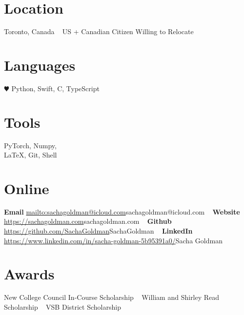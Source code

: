 \documentclass[]{style}
\begin{document}


\begin{aside} %
\section{Location}
Toronto, Canada
~ \vspace{-2mm}
US + Canadian Citizen 
Willing to Relocate
\section{Languages}
{\color{red} $\varheartsuit$} Python, Swift, 
C, TypeScript
\section{Tools}
PyTorch, Numpy, \\ \LaTeX, Git, Shell
\section{Online}
\textbf{Email}
\url{mailto:sachagoldman@icloud.com}{sachagoldman@icloud.com} 
~ \vspace{-2mm}
\textbf{Website} 
\url{https://sachagoldman.com}{sachagoldman.com} 
~ \vspace{-2mm}
\textbf{Github}
\url{https://github.com/SachaGoldman}{SachaGoldman}
~ \vspace{-2mm}
\textbf{LinkedIn}
\url{https://www.linkedin.com/in/sacha-goldman-5b95391a0/}{Sacha Goldman}
\section{Awards}
New College Council 
In-Course Scholarship
~ \vspace{-1mm}
William and Shirley Read 
Scholarship
~ \vspace{-1mm}
VSB District Scholarship
\end{aside}

\end{document}
